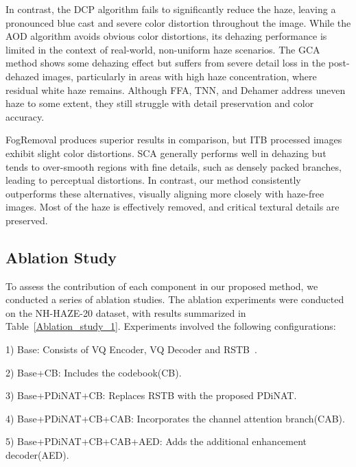 \documentclass[journal]{IEEEtran}
\begin{document}
In contrast, the DCP algorithm fails to significantly reduce the haze, leaving a pronounced blue cast and severe color distortion throughout the image. While the AOD algorithm avoids obvious color distortions, its dehazing performance is limited in the context of real-world, non-uniform haze scenarios. The GCA method shows some dehazing effect but suffers from severe detail loss in the post-dehazed images, particularly in areas with high haze concentration, where residual white haze remains. Although FFA, TNN, and Dehamer address uneven haze to some extent, they still struggle with detail preservation and color accuracy.

FogRemoval produces superior results in comparison, but ITB processed images exhibit slight color distortions. SCA generally performs well in dehazing but tends to over-smooth regions with fine details, such as densely packed branches, leading to perceptual distortions. In contrast, our method consistently outperforms these alternatives, visually aligning more closely with haze-free images. Most of the haze is effectively removed, and critical textural details are preserved.

\subsection{Ablation Study}
To assess the contribution of each component in our proposed method, we conducted a series of ablation studies. The ablation experiments were conducted on the NH-HAZE-20 dataset, with results summarized in Table~\ref{Ablation_study_1}. Experiments involved the following configurations:

1) Base: Consists of VQ Encoder, VQ Decoder and RSTB~\cite{liang2021swinir}.

2) Base+CB: Includes the codebook(CB).

3) Base+PDiNAT+CB: Replaces RSTB with the proposed PDiNAT.

4) Base+PDiNAT+CB+CAB: Incorporates the channel attention branch(CAB).

5) Base+PDiNAT+CB+CAB+AED: Adds the additional enhancement decoder(AED).
\end{document}
